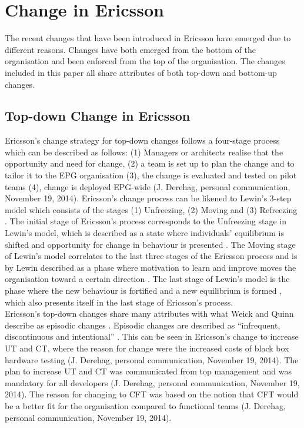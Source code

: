 \documentclass[final_report_innit.tex]{subfiles}
\begin{document}
\section{Change in Ericsson}
The recent changes that have been introduced in Ericsson have emerged due to different reasons. Changes have both emerged from the bottom of the organisation and been enforced from the top of the organisation. The changes included in this paper all share attributes of both top-down and bottom-up changes. 

\subsection{Top-down Change in Ericsson}
Ericsson’s change strategy for top-down changes follows a four-stage process which can be described as follows: (1) Managers or architects realise that the opportunity and need for change, (2) a team is set up to plan the change and to tailor it to the EPG organisation (3), the change is evaluated and tested on pilot teams (4), change is deployed EPG-wide (J. Derehag, personal communication, November 19, 2014). Ericsson’s change process can be likened to Lewin’s 3-step model \cite{burnes2004kurt} which consists of the stages (1) Unfreezing, (2) Moving and (3) Refreezing \cite{burnes2004kurt}. The initial stage of Ericsson’s process corresponds to the Unfreezing stage in Lewin’s model, which is described as a state where individuals’ equilibrium is shifted and opportunity for change in behaviour is presented \cite{burnes2004kurt}. The Moving stage of Lewin’s model correlates to the last three stages of the Ericsson process and is by Lewin described as a phase where motivation to learn and improve moves the organisation toward a certain direction \cite{burnes2004kurt}. The last stage of Lewin’s model is the phase where the new behaviour is fortified and a new equilibrium is formed \cite{burnes2004kurt}, which also presents itself in the last stage of Ericsson’s process. 
\\

Ericsson’s top-down changes share many attributes with what Weick and Quinn describe as episodic changes \cite{weick1999organizational}. Episodic changes are described as “infrequent, discontinuous and intentional” \cite{weick1999organizational}. This can be seen in Ericsson’s change to increase UT and CT, where the reason for change were the increased costs of black box hardware testing (J. Derehag, personal communication, November 19, 2014). The plan to increase UT and CT was communicated from top management and was mandatory for all developers (J. Derehag, personal communication, November 19, 2014). The reason for changing to CFT was based on the notion that CFT would be a better fit for the organisation compared to functional teams (J. Derehag, personal communication, November 19, 2014). 
\\
\end{document}

